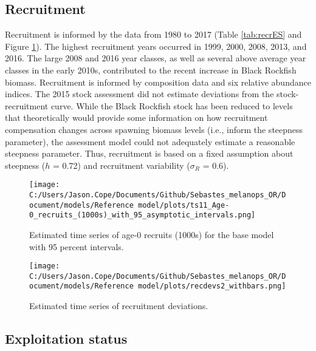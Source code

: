 \documentclass[11pt,
  english,
  letterpaper,
]{article}
\begin{document}
\clearpage

\hypertarget{recruitment}{%
\subsection*{Recruitment}\label{recruitment}}

Recruitment is informed by the data from 1980 to 2017 (Table \ref{tab:recrES} and Figure \ref{fig:es-recruits}). The highest recruitment years occurred in 1999, 2000, 2008, 2013, and 2016. The large 2008 and 2016 year classes, as well as several above average year classes in the early 2010s, contributed to the recent increase in Black Rockfish biomass. Recruitment is informed by composition data and six relative abundance indices. The 2015 stock assessment did not estimate deviations from the stock-recruitment curve. While the Black Rockfish stock has been reduced to levels that theoretically would provide some information on how recruitment compensation changes across spawning biomass levels (i.e., inform the steepness parameter), the assessment model could not adequately estimate a reasonable steepness parameter. Thus, recruitment is based on a fixed assumption about steepness (\(h\) = 0.72) and recruitment variability (\(\sigma_R\) = 0.6).



\begin{figure}
\centering
\texttt{[image: C:/Users/Jason.Cope/Documents/Github/Sebastes\_melanops\_OR/Document/models/Reference model/plots/ts11\_Age-0\_recruits\_(1000s)\_with\_95\_asymptotic\_intervals.png]}
\caption{Estimated time series of age-0 recruits (1000s) for the base model with 95 percent intervals.\label{fig:es-recruits}}
\end{figure}

\begin{figure}
\centering
\texttt{[image: C:/Users/Jason.Cope/Documents/Github/Sebastes\_melanops\_OR/Document/models/Reference model/plots/recdevs2\_withbars.png]}
\caption{Estimated time series of recruitment deviations.\label{fig:es-recdev}}
\end{figure}

\hypertarget{exploitation-status}{%
\subsection*{Exploitation status}\label{exploitation-status}}
\end{document}
